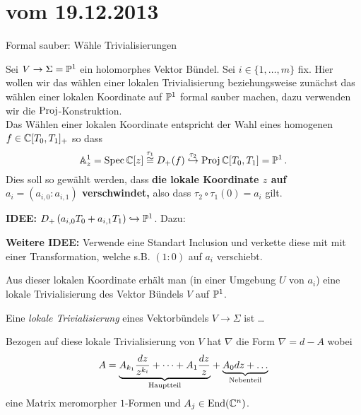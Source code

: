\section*{vom 19.12.2013}

\begin{ex}
Formal sauber: Wähle Trivialisierungen
\end{ex}
Sei $V\to\Sigma=\P^1$ ein holomorphes Vektor Bündel.
Sei $i\in\{1,\dots,m\}$ fix.
Hier wollen wir das wählen einer lokalen Trivialisierung beziehungsweise
zunächst das wählen einer lokalen Koordinate auf $\P^1$ formal sauber machen,
dazu verwenden wir die $\Proj$-Konstruktion.\\
Das Wählen einer lokalen Koordinate entspricht der Wahl eines homogenen
$f\in\C[T_0,T_1]_+$ so dass
\[
\A_z^1=\Spec\C[z] \overset{\tau_1}\cong D_+(f)
\overset{\tau_2}\hookrightarrow
\Proj\C[T_0,T_1]=\P^1 \,.
\]
Dies soll so gewählt werden, dass \textbf{\boldmath die lokale Koordinate $z$
auf $a_i=(a_{i,0}:a_{i,1})$ verschwindet,} also dass $\tau_2\circ\tau_1(0)=a_i$
gilt.

\textbf{IDEE:} $D_+\left(a_{i,0}T_0 + a_{i,1}T_1\right)\hookrightarrow \P^1$.
Dazu:
\begin{comment}
\begin{align*}
D_+\left(a_{i,0}T_0 + a_{i,1}T_1\right)
  &=\Proj \C[T_0,T_1]\Big\backslash
    V_+\Big(\left(a_{i,0}T_0 + a_{i,1}T_1\right)\Big)
\\&\hookrightarrow\P^1
    \qquad \text{~durch~} \qquad a\mapsto a
\end{align*}
\textbf{Fall:} $a=(1:0)$ dann ist $\A^1\cong D_+(T_1)\hookrightarrow \P^1$
durch $x \mapsto (1,z)$
\end{comment}
\textbf{Weitere IDEE:}
Verwende eine Standart Inclusion und verkette diese mit mit einer
Transformation, welche s.B. $(1:0)$ auf $a_i$ verschiebt.

Aus dieser lokalen Koordinate erhält man (in einer Umgebung $U$ von $a_i$) eine
lokale Trivialisierung des Vektor Bündels $V$ auf $\P^1$.
\begin{defn}
Eine \emph{lokale Trivialisierung} eines Vektorbündels $V\to\Sigma$ ist \dots
\end{defn}
\begin{comment}
Wähle an einem Punkt und setze von dort aus fort?!?
\end{comment}
Bezogen auf diese lokale Trivialisierung von $V$ hat $\nabla$ die Form
$\nabla=d-A$ wobei
\[
A=\underset{\text{Hauptteil}}{\underbrace{%
    A_{k_1}\frac{dz}{z^{k_i}} +\dots+ A_{1}\frac{dz}{z}
  }} +
  \underset{\text{Nebenteil}}{\underbrace{A_0dz +\dots}}
\]
eine Matrix meromorpher $1$-Formen und $A_j\in\End(\C^n)$.
\begin{comment}
\begin{defn}
Eine meromorphe $1$-Form ist ein Element $\omega\in\Omega^1(V;\C)$ welche sich
als $\omega=udz$ mit meromorphen $u$ schreiben lässt.
\end{defn}
\end{comment}
\TODO

